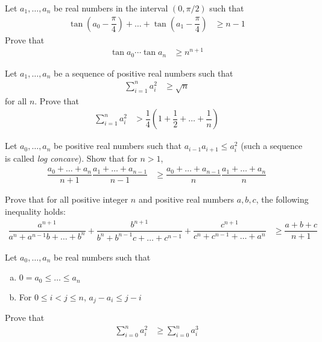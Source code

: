 \documentclass{subfile}
\begin{document}
		\begin{problem}
			Let $a_{1},\ldots,a_{n}$ be real numbers in the interval $(0,\pi/2)$ such that
				\begin{align*}
					\tan\left(a_{0}-\dfrac{\pi}{4}\right)+\ldots+\tan\left(a_{1}-\dfrac{\pi}{4}\right)
						& \geq n-1
				\end{align*}
			Prove that
				\begin{align*}
					\tan{a_{0}}\cdots\tan{a_{n}}
						& \geq n^{n+1}
				\end{align*}
		\end{problem}
	
		\begin{problem}
			Let $a_{1},\ldots,a_{n}$ be a sequence of positive real numbers such that
				\begin{align*}
					\sum_{i=1}^{n}a_{i}^{2}
						& \geq \sqrt{n}
				\end{align*}
			for all $n$. Prove that
				\begin{align*}
					\sum_{i=1}^{n}a_{i}^{2}
						& > \dfrac{1}{4}\left(1+\dfrac{1}{2}+\ldots+\dfrac{1}{n}\right)
				\end{align*}
		\end{problem}
	
		\begin{problem}
			Let $a_{0},\ldots,a_{n}$ be positive real numbers such that $a_{i-1}a_{i+1}\leq a_{i}^2$ (such a sequence is called \textit{log concave}). Show that for $n>1$,
				\begin{align*}
					\dfrac{a_{0}+\ldots+a_{n}}{n+1}\dfrac{a_{1}+\ldots+a_{n-1}}{n-1}
						& \geq\dfrac{a_{0}+\ldots+a_{n-1}}{n}\dfrac{a_{1}+\ldots+a_{n}}{n}
				\end{align*}
		\end{problem}
	
		\begin{problem}
			Prove that for all positive integer $n$ and positive real numbers $a,b,c$, the following inequality holds:
				\begin{align*}
					\dfrac{a^{n+1}}{a^{n}+a^{n-1}b+\ldots+b^{n}}+\dfrac{b^{n+1}}{b^{n}+b^{n-1}c+\ldots+c^{n-1}}+\dfrac{c^{n+1}}{c^{n}+c^{n-1}+\ldots+a^{n}}
						& \geq\dfrac{a+b+c}{n+1}
				\end{align*}
		\end{problem}
	
		\begin{problem}
			Let $a_{0},\ldots,a_{n}$ be real numbers such that
				\begin{enumerate}[(a)]
					\item $0= a_{0}\leq\ldots\leq a_{n}$
					\item For $0\leq i<j\leq n$, $a_{j}-a_{i}\leq j-i$
				\end{enumerate}
			Prove that
				\begin{align*}
					\sum_{i=0}^{n}a_{i}^{2}
						& \geq\sum_{i=0}^{n}a_{i}^{3}
				\end{align*}
		\end{problem}
	
\end{document}

